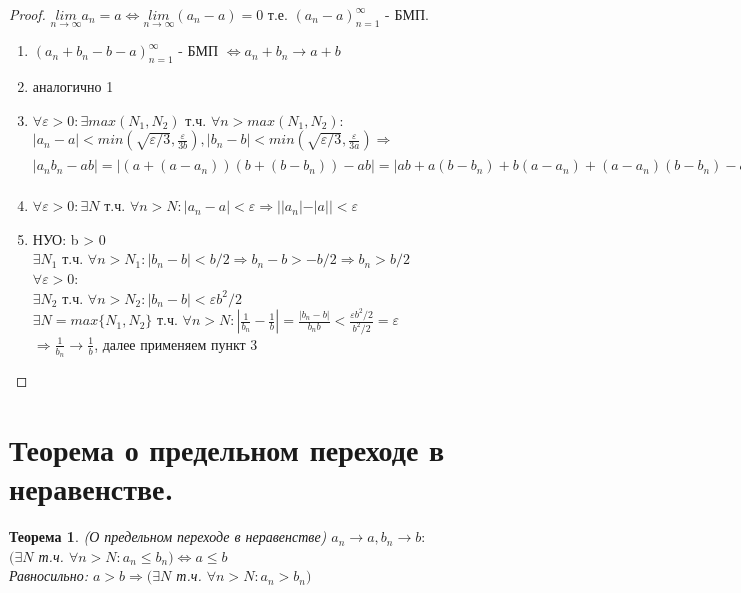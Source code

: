 \documentclass[12pt, a4]{article}
\newtheorem*{theorem}{Теорема}
\renewcommand{\lim}[2]{\underset{#1 \rightarrow #2}{lim}}
\newcommand{\limn}{\lim{n}{\infty}}
\renewcommand{\implies}{\Rightarrow}
\renewcommand{\iff}{\Leftrightarrow}
\renewcommand{\epsilon}{\varepsilon}
\begin{document}
\begin{proof}
$\limn a_n = a \iff \limn (a_n - a) = 0$ т.е. $(a_n - a)_{n=1}^\infty$ - БМП.
\begin{enumerate}
    \item $(a_n + b_n - b - a)_{n=1}^\infty$ - БМП $\iff a_n + b_n \to a+b$
    \item аналогично 1
    \item $\forall \epsilon > 0: \exists max(N_1, N_2)$ т.ч. $\forall n > max(N_1, N_2):$\\ 
    $|a_n-a| < min(\sqrt{\epsilon/3},\frac{\epsilon}{3b}), |b_n-b| < min(\sqrt{\epsilon/3},\frac{\epsilon}{3a}) \implies$\\ 
    $|a_n b_n - ab| = |(a+(a-a_n))(b+(b-b_n))-ab|=|ab+a(b-b_n)+b(a-a_n)+(a-a_n)(b-b_n)-ab|\leq|a(b-b_n)|+|b(a-a_n)|+|(a-a_n)(b-b_n)| < |\frac{\epsilon a}{3a}| + |\frac{\epsilon b}{3b}| + |\sqrt{\epsilon/3}^2| = \epsilon$
    \item $\forall \epsilon > 0: \exists N$ т.ч. $\forall n > N: |a_n - a| < \epsilon \implies ||a_n|-|a|| < \epsilon$
    \item НУО: b > 0\\
    $\exists N_1$ т.ч. $\forall n > N_1: |b_n - b| < b/2 \implies b_n - b > -b/2 \implies b_n > b/2$\\
    $\forall \epsilon > 0$:\\
    $\exists N_2$ т.ч. $\forall n > N_2: |b_n - b| < \epsilon b^2/2$\\
    $\exists N = max\{N_1, N_2\}$ т.ч. $\forall n > N: |\frac{1}{b_n}-\frac{1}{b}|=\frac{|b_n-b|}{b_n b} < \frac{\epsilon b^2/2}{b^2/2}=\epsilon$\\
    $\implies \frac{1}{b_n} \to \frac{1}{b}$, далее применяем пункт 3
    
\end{enumerate}
\end{proof}

\section{Теорема о предельном переходе в неравенстве.}

\begin{theorem}(О предельном переходе в неравенстве)
$a_n \to a, b_n \to b:$\\
$(\exists N$ т.ч. $\forall n > N: a_n \leq b_n) \iff a \leq b$ \\
Равносильно: $a > b \implies (\exists N$ т.ч. $\forall n > N: a_n > b_n)$
\end{theorem}
\end{document}
